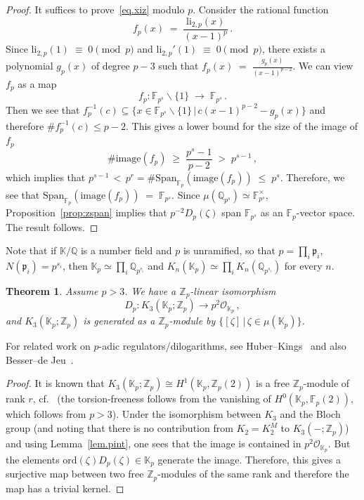 \documentclass[12pt,reqno]{amsart}
\newcounter{theoremcount}
\newtheorem{theorem}[theoremcount]{Theorem}
\theoremstyle{definition}
\def\BZ{\mathbb Z}
\def\BQ{\mathbb Q}
\def\BF{\mathbb F}
\def\BK{\mathbb K}
\def\be{\begin{equation}}
\def\ee{\end{equation}}
\def\z{\zeta}
\def\calO{\mathcal{O}}
\def\={\;=\;}
\begin{document}
\begin{proof}
It suffices to prove~\eqref{eq.xiz} modulo $p$. 
Consider the rational function
\be
f_{p}(x)
\=
\frac{\mathrm{li}_{2,p}(x)}
{(x-1)^p}\,.
\ee
Since $\mathrm{li}_{2,p}(1)\;\equiv\;0\pmod{p}$ and
$\mathrm{li}_{2,p}'(1)\;\equiv\;0\pmod{p}$, there exists a polynomial $g_{p}(x)$
of degree $p-3$ such that $f_{p}(x)\=\frac{g_{p}(x)}{(x-1)^{p-2}}$.
We can view $f_p$ as a map
\be
f_{p}:\BF_{p^{s}}\smallsetminus\{1\}\;\rightarrow\;\BF_{p^{s}}\,.
\ee
Then we see that $f_{p}^{-1}(c) \subseteq
\{x\in\BF_{p^{s}}\smallsetminus\{1\}\,|\,c(x-1)^{p-2}-g_{p}(x)\}$
and therefore $\#f_{p}^{-1}(c)\leq p-2$. 
This gives a lower bound for the size of the image of $f_{p}$ 
\be
\#\mathrm{image}(f_{p})\;\geq\;\frac{p^{s}-1}{p-2}\;>\;p^{s-1}\,,
\ee
which implies that
$ p^{s-1}\,<\,p^{r} =\#\mathrm{Span}_{\BF_{p}}(\mathrm{image}(f_{p})) \;\leq\;p^{s}$.
Therefore, we see that
$\mathrm{Span}_{\BF_{p}}(\mathrm{image}(f_{p})) \= \BF_{p^s}$.
Since $\mu(\BQ_{p^s}) \simeq \BF_{p^s}^{\times}$, Proposition~\ref{prop:zspan} implies 
that $p^{-2}D_{p}(\z)$ span $\BF_{p^s}$ as an $\BF_p$-vector space. The result
follows. 
\end{proof}

Note that if $\BK/\BQ$ is a number field and $p$ is unramified, so that
$p=\prod_i\mathfrak{p}_i$, $N(\mathfrak{p}_i)=p^{s_i}$, then
$\BK_p \simeq \prod_i \BQ_{p^{s_i}}$ and $K_n(\BK_p) \simeq \prod_i K_n(\BQ_{p^{s_i}})$
for every $n$.

\begin{theorem} 
\label{thm.xiz}
Assume $p>3$. We have a $\BZ_p$-linear isomorphism
\be
D_p: K_3(\BK_p;\BZ_p) \to p^2\calO_{\BK_{p}}\,,
\ee
and $K_3(\BK_p;\BZ_p)$ is generated as a $\BZ_p$-module by
$\{[\z]\,|\,\z\in \mu(\BK_p) \}$.
\end{theorem}

For related work on $p$-adic regulators/dilogarithms, see Huber--Kings~\cite{Huber}
and also Besser--de Jeu~\cite[Thm.1.6(2)]{BJ:syntomic}.

\begin{proof}
It is known that $K_3(\BK_p;\BZ_p)\cong H^1(\BK_p,\BZ_p(2))$ is a free $\BZ_p$-module
of rank $r$, cf.~\cite[Thm. 7.4]{Weibel:Kbook} (the torsion-freeness follows from
the vanishing of $H^0(\BK_p,\BF_p(2))$, which follows from $p>3$). Under the
isomorphism between $K_3$ and the Bloch group (and noting that there is no
contribution from $K_2=K_2^M$ to $K_3(-;\BZ_p)$) and using Lemma~\ref{lem.pint}, one
sees that the image is contained in $p^2\calO_{\BK_p}$. But the elements
$\mathrm{ord}(\z)D_p(\z)\in\BK_{p}$ generate the image. Therefore, this gives a
surjective map between two free $\BZ_p$-modules of the same rank and therefore the
map has a trivial kernel.
\end{proof}
\end{document}
